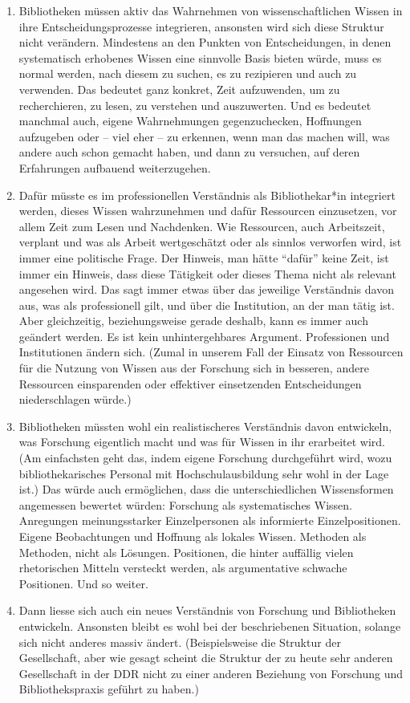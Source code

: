 \documentclass[a4paper,
fontsize=11pt,
oneside,
numbers=noperiodatend,
parskip=half-,
bibliography=totoc,
final
]{scrartcl}
\begin{document}
\begin{enumerate}
\def\labelenumi{(\arabic{enumi})}
\item
  Bibliotheken müssen aktiv das Wahrnehmen von wissenschaftlichen Wissen
  in ihre Entscheidungsprozesse integrieren, ansonsten wird sich diese
  Struktur nicht verändern. Mindestens an den Punkten von
  Entscheidungen, in denen systematisch erhobenes Wissen eine sinnvolle
  Basis bieten würde, muss es normal werden, nach diesem zu suchen, es
  zu rezipieren und auch zu verwenden. Das bedeutet ganz konkret, Zeit
  aufzuwenden, um zu recherchieren, zu lesen, zu verstehen und
  auszuwerten. Und es bedeutet manchmal auch, eigene Wahrnehmungen
  gegenzuchecken, Hoffnungen aufzugeben oder -- viel eher -- zu
  erkennen, wenn man das machen will, was andere auch schon gemacht
  haben, und dann zu versuchen, auf deren Erfahrungen aufbauend
  weiterzugehen.
\item
  Dafür müsste es im professionellen Verständnis als Bibliothekar*in
  integriert werden, dieses Wissen wahrzunehmen und dafür Ressourcen
  einzusetzen, vor allem Zeit zum Lesen und Nachdenken. Wie Ressourcen,
  auch Arbeitszeit, verplant und was als Arbeit wertgeschätzt oder als
  sinnlos verworfen wird, ist immer eine politische Frage. Der Hinweis,
  man hätte \enquote{dafür} keine Zeit, ist immer ein Hinweis, dass
  diese Tätigkeit oder dieses Thema nicht als relevant angesehen wird.
  Das sagt immer etwas über das jeweilige Verständnis davon aus, was als
  professionell gilt, und über die Institution, an der man tätig ist.
  Aber gleichzeitig, beziehungsweise gerade deshalb, kann es immer auch
  geändert werden. Es ist kein unhintergehbares Argument. Professionen
  und Institutionen ändern sich. (Zumal in unserem Fall der Einsatz von
  Ressourcen für die Nutzung von Wissen aus der Forschung sich in
  besseren, andere Ressourcen einsparenden oder effektiver einsetzenden
  Entscheidungen niederschlagen würde.)
\item
  Bibliotheken müssten wohl ein realistischeres Verständnis davon
  entwickeln, was Forschung eigentlich macht und was für Wissen in ihr
  erarbeitet wird. (Am einfachsten geht das, indem eigene Forschung
  durchgeführt wird, wozu bibliothekarisches Personal mit
  Hochschulausbildung sehr wohl in der Lage ist.) Das würde auch
  ermöglichen, dass die unterschiedlichen Wissensformen angemessen
  bewertet würden: Forschung als systematisches Wissen. Anregungen
  meinungsstarker Einzelpersonen als informierte Einzelpositionen.
  Eigene Beobachtungen und Hoffnung als lokales Wissen. Methoden als
  Methoden, nicht als Lösungen. Positionen, die hinter auffällig vielen
  rhetorischen Mitteln versteckt werden, als argumentative schwache
  Positionen. Und so weiter.
\item
  Dann liesse sich auch ein neues Verständnis von Forschung und
  Bibliotheken entwickeln. Ansonsten bleibt es wohl bei der
  beschriebenen Situation, solange sich nicht anderes massiv ändert.
  (Beispielsweise die Struktur der Gesellschaft, aber wie gesagt scheint
  die Struktur der zu heute sehr anderen Gesellschaft in der DDR nicht
  zu einer anderen Beziehung von Forschung und Bibliothekspraxis geführt
  zu haben.)
\end{enumerate}
\end{document}

